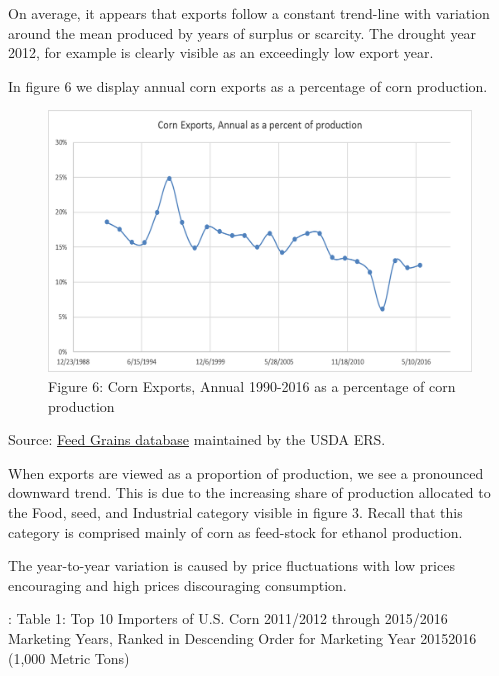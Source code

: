 \documentclass[]{book}
\theoremstyle{definition}
\theoremstyle{definition}
\theoremstyle{remark}
\begin{document}
On average, it appears that exports follow a constant trend-line with
variation around the mean produced by years of surplus or scarcity. The
drought year 2012, for example is clearly visible as an exceedingly low
export year.

In figure 6 we display annual corn exports as a percentage of corn
production.

\begin{figure}[htbp]
\centering
\includegraphics{Excel-files/IntroductiontoCommodityTS-FeedGrains_Corn_files/image029.png}
\caption{Figure 6: Corn Exports, Annual 1990-2016 as a percentage of
corn production}
\end{figure}

Source:
\href{http://www.ers.usda.gov/data-products/feed-grains-database/feed-grains-yearbook-tables.aspx\#26780}{Feed
Grains database} maintained by the USDA ERS.

When exports are viewed as a proportion of production, we see a
pronounced downward trend. This is due to the increasing share of
production allocated to the Food, seed, and Industrial category visible
in figure 3. Recall that this category is comprised mainly of corn as
feed-stock for ethanol production.

The year-to-year variation is caused by price fluctuations with low
prices encouraging and high prices discouraging consumption.

: Table 1: Top 10 Importers of U.S. Corn 2011/2012 through 2015/2016
Marketing Years, Ranked in Descending Order for Marketing Year 20152016
(1,000 Metric Tons)
\end{document}
